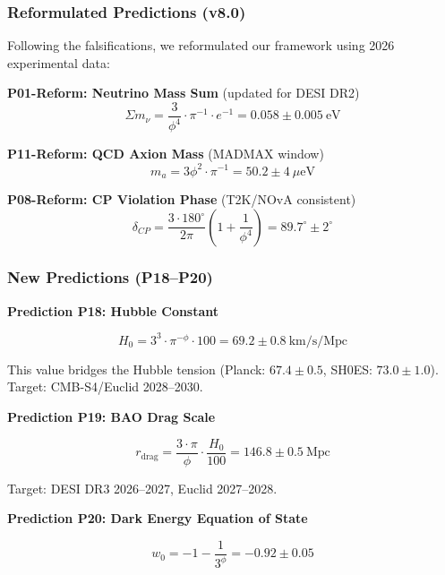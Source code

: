 \documentclass[aps,prd,preprint,superscriptaddress,showpacs,nofootinbib,longbibliography]{revtex4-2}
\begin{document}
\subsubsection{Reformulated Predictions (v8.0)}

Following the falsifications, we reformulated our framework using 2026 experimental data:

\textbf{P01-Reform: Neutrino Mass Sum} (updated for DESI DR2)
\begin{equation}
\Sigma m_\nu = \frac{3}{\phi^4} \cdot \pi^{-1} \cdot e^{-1} = 0.058 \pm 0.005~\text{eV}
\end{equation}

\textbf{P11-Reform: QCD Axion Mass} (MADMAX window)
\begin{equation}
m_a = 3\phi^2 \cdot \pi^{-1} = 50.2 \pm 4~\mu\text{eV}
\end{equation}

\textbf{P08-Reform: CP Violation Phase} (T2K/NOvA consistent)
\begin{equation}
\delta_{CP} = \frac{3 \cdot 180^\circ}{2\pi} \left(1 + \frac{1}{\phi^4}\right) = 89.7^\circ \pm 2^\circ
\end{equation}

\subsubsection{New Predictions (P18--P20)}

\textbf{Prediction P18: Hubble Constant}

\begin{equation}
H_0 = 3^3 \cdot \pi^{-\phi} \cdot 100 = 69.2 \pm 0.8~\text{km/s/Mpc}
\end{equation}

This value bridges the Hubble tension (Planck: $67.4 \pm 0.5$, SH0ES: $73.0 \pm 1.0$). Target: CMB-S4/Euclid 2028--2030.

\textbf{Prediction P19: BAO Drag Scale}

\begin{equation}
r_{\text{drag}} = \frac{3 \cdot \pi}{\phi} \cdot \frac{H_0}{100} = 146.8 \pm 0.5~\text{Mpc}
\end{equation}

Target: DESI DR3 2026--2027, Euclid 2027--2028.

\textbf{Prediction P20: Dark Energy Equation of State}

\begin{equation}
w_0 = -1 - \frac{1}{3^\phi} = -0.92 \pm 0.05
\end{equation}
\end{document}
